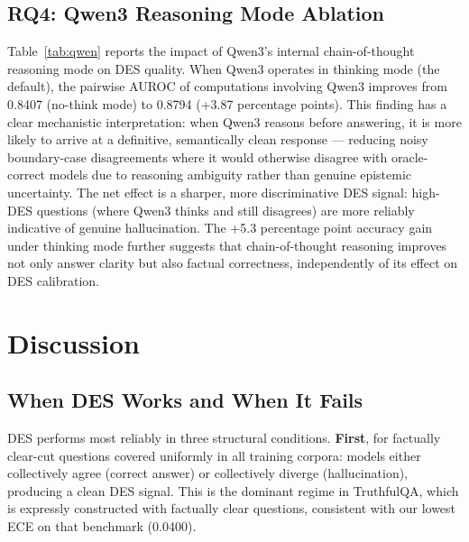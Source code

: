 \documentclass[journal]{IEEEtran}
\begin{document}
\subsection{RQ4: Qwen3 Reasoning Mode Ablation}

\begin{table}[!t]
  \caption{Qwen3 Reasoning Mode Ablation}
  \label{tab:qwen}
  \centering
  \resizebox{\columnwidth}{!}{%
  
  }
\end{table}

Table~\ref{tab:qwen} reports the impact of Qwen3's internal chain-of-thought
reasoning mode on DES quality.
When Qwen3 operates in thinking mode (the default), the pairwise AUROC of
computations involving Qwen3 improves from 0.8407 (no-think mode) to
0.8794 (+3.87 percentage points).
This finding has a clear mechanistic interpretation: when Qwen3 reasons
before answering, it is more likely to arrive at a definitive, semantically
clean response --- reducing noisy boundary-case disagreements where it would
otherwise disagree with oracle-correct models due to reasoning ambiguity
rather than genuine epistemic uncertainty.
The net effect is a sharper, more discriminative DES signal: high-DES
questions (where Qwen3 thinks and still disagrees) are more reliably
indicative of genuine hallucination. The +5.3 percentage point accuracy gain 
under thinking mode further suggests that chain-of-thought reasoning improves 
not only answer clarity but also factual correctness, independently of its effect 
on DES calibration.

\section{Discussion}
\label{sec:discussion}

\subsection{When DES Works and When It Fails}

DES performs most reliably in three structural conditions.
\textbf{First}, for factually clear-cut questions covered uniformly
in all training corpora: models either collectively agree (correct answer)
or collectively diverge (hallucination), producing a clean DES signal.
This is the dominant regime in TruthfulQA, which is expressly constructed
with factually clear questions, consistent with our lowest ECE on that
benchmark (0.0400).
\end{document}
